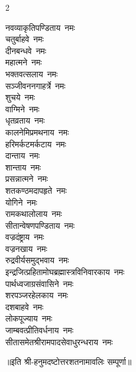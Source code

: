 \begin{multicols}{2}
\begin{flushleft}
नवव्याकृतिपण्डिताय~नमः\\
चतुर्बाहवे~नमः\\
दीनबन्धवे~नमः\\
महात्मने~नमः\\
भक्तवत्सलाय~नमः\\
सञ्जीवननगाहर्त्रे~नमः\\
शुचये~नमः\\
वाग्मिने~नमः\\
धृतव्रताय~नमः\\
कालनेमिप्रमथनाय~नमः\hfill{}\\
हरिमर्कटमर्कटाय~नमः\\
दान्ताय~नमः\\
शान्ताय~नमः\\
प्रसन्नात्मने~नमः\\
शतकण्ठमदापहृते~नमः\\
योगिने~नमः\\
रामकथालोलाय~नमः\\
सीतान्वेषणपण्डिताय~नमः\\
वज्रदंष्ट्राय~नमः\\
वज्रनखाय~नमः\hfill{}\\
रुद्रवीर्यसमुद्भवाय~नमः\\
इन्द्रजित्प्रहितामोघ\-ब्रह्मास्त्रविनिवारकाय~नमः\\
पार्थध्वजाग्रसंवासिने~नमः\\
शरपञ्जरहेलकाय~नमः\\
दशबाहवे~नमः\\
लोकपूज्याय~नमः\\
जाम्बवत्प्रीतिवर्धनाय~नमः\\
सीतासमेतश्रीराम\-पादसेवाधुरन्धराय~नमः\\
\end{flushleft}
\end{multicols}

\centerline{॥इति श्री-हनुमदष्टोत्तरशतनामावलिः सम्पूर्णा॥}

